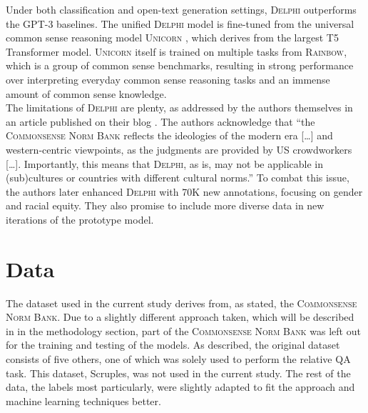 \documentclass[final]{clv3} %
\begin{document}
Under both classification and open-text generation settings, \textsc{Delphi} outperforms the GPT-3 baselines. The unified \textsc{Delphi} model is fine-tuned from the universal common sense reasoning model \textsc{Unicorn} \cite{lourie}, which derives from the largest T5 Transformer model. \textsc{Unicorn} itself is trained on multiple tasks from \textsc{Rainbow}, which is a group of common sense benchmarks, resulting in strong performance over interpreting everyday common sense reasoning tasks and an immense amount of common sense knowledge.\\

The limitations of \textsc{Delphi} are plenty, as addressed by the authors themselves in an article published on their blog \cite{jiang-blog}. The authors acknowledge that “the \textsc{Commonsense Norm Bank} reflects the ideologies of the modern era […] and western-centric viewpoints, as the judgments are provided by US crowdworkers […]. Importantly, this means that \textsc{Delphi}, as is, may not be applicable in (sub)cultures or countries with different cultural norms.” To combat this issue, the authors later enhanced \textsc{Delphi} with 70K new annotations, focusing on gender and racial equity. They also promise to include more diverse data in new iterations of the prototype model. 


\section{Data}

The dataset used in the current study derives from, as stated, the \textsc{Commonsense Norm Bank}. Due to a slightly different approach taken, which will be described in in the methodology section, part of the \textsc{Commonsense Norm Bank} was left out for the training and testing of the models. As described, the original dataset consists of five others, one of which was solely used to perform the relative QA task. This dataset, Scruples, was not used in the current study. The rest of the data, the labels most particularly, were slightly adapted to fit the approach and machine learning techniques better. \\
\end{document}
